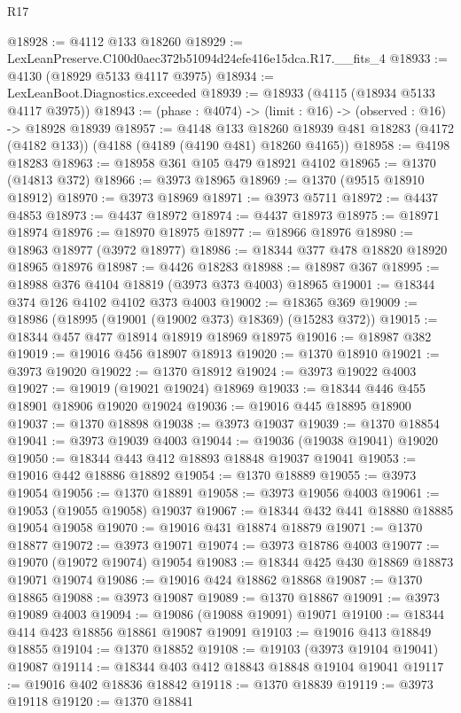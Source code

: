 \begin{lexlean}{R17}
\begin{coremodule}
@18928 := @4112 @133 @18260
@18929 := LexLeanPreserve.C100d0aec372b51094d24efe416e15dca.R17.__fits_4
@18933 := @4130 (@18929 @5133 @4117 @3975)
@18934 := LexLeanBoot.Diagnostics.exceeded
@18939 := @18933 (@4115 (@18934 @5133 @4117 @3975))
@18943 := (phase : @4074) -> (limit : @16) -> (observed : @16) -> @18928 @18939
@18957 := @4148
    @133
    @18260
    @18939
    @481
    @18283
    (@4172 (@4182 @133))
    (@4188 (@4189 (@4190 @481) @18260 @4165))
@18958 := @4198 @18283
@18963 := @18958 @361 @105 @479 @18921 @4102
@18965 := @1370 (@14813 @372)
@18966 := @3973 @18965
@18969 := @1370 (@9515 @18910 @18912)
@18970 := @3973 @18969
@18971 := @3973 @5711
@18972 := @4437 @4853
@18973 := @4437 @18972
@18974 := @4437 @18973
@18975 := @18971 @18974
@18976 := @18970 @18975
@18977 := @18966 @18976
@18980 := @18963 @18977 (@3972 @18977)
@18986 := @18344 @377 @478 @18820 @18920 @18965 @18976
@18987 := @4426 @18283
@18988 := @18987 @367
@18995 := @18988 @376 @4104 @18819 (@3973 @373 @4003) @18965
@19001 := @18344 @374 @126 @4102 @4102 @373 @4003
@19002 := @18365 @369
@19009 := @18986 (@18995 (@19001 (@19002 @373) @18369) (@15283 @372))
@19015 := @18344 @457 @477 @18914 @18919 @18969 @18975
@19016 := @18987 @382
@19019 := @19016 @456 @18907 @18913
@19020 := @1370 @18910
@19021 := @3973 @19020
@19022 := @1370 @18912
@19024 := @3973 @19022 @4003
@19027 := @19019 (@19021 @19024) @18969
@19033 := @18344 @446 @455 @18901 @18906 @19020 @19024
@19036 := @19016 @445 @18895 @18900
@19037 := @1370 @18898
@19038 := @3973 @19037
@19039 := @1370 @18854
@19041 := @3973 @19039 @4003
@19044 := @19036 (@19038 @19041) @19020
@19050 := @18344 @443 @412 @18893 @18848 @19037 @19041
@19053 := @19016 @442 @18886 @18892
@19054 := @1370 @18889
@19055 := @3973 @19054
@19056 := @1370 @18891
@19058 := @3973 @19056 @4003
@19061 := @19053 (@19055 @19058) @19037
@19067 := @18344 @432 @441 @18880 @18885 @19054 @19058
@19070 := @19016 @431 @18874 @18879
@19071 := @1370 @18877
@19072 := @3973 @19071
@19074 := @3973 @18786 @4003
@19077 := @19070 (@19072 @19074) @19054
@19083 := @18344 @425 @430 @18869 @18873 @19071 @19074
@19086 := @19016 @424 @18862 @18868
@19087 := @1370 @18865
@19088 := @3973 @19087
@19089 := @1370 @18867
@19091 := @3973 @19089 @4003
@19094 := @19086 (@19088 @19091) @19071
@19100 := @18344 @414 @423 @18856 @18861 @19087 @19091
@19103 := @19016 @413 @18849 @18855
@19104 := @1370 @18852
@19108 := @19103 (@3973 @19104 @19041) @19087
@19114 := @18344 @403 @412 @18843 @18848 @19104 @19041
@19117 := @19016 @402 @18836 @18842
@19118 := @1370 @18839
@19119 := @3973 @19118
@19120 := @1370 @18841

\end{coremodule}
\end{lexlean}
